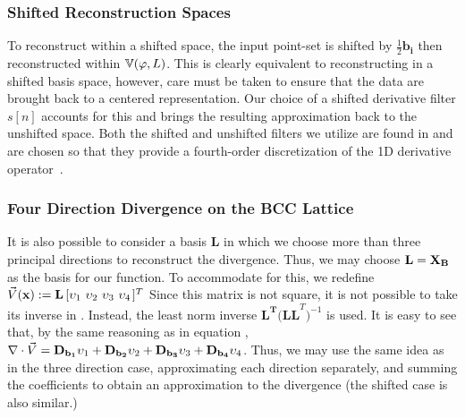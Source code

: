 \subsubsection{Shifted Reconstruction Spaces}
To reconstruct within a shifted space, the input point-set is shifted by $\frac{1}{2}\mathbf{b_i}$ then reconstructed within $\mathbb{V}(\varphi, L)$. This is clearly equivalent to reconstructing in a shifted basis space, however, care must be taken to ensure that the data are brought back to a centered representation. Our choice of a shifted derivative filter $s[n]$ accounts for this and brings the resulting approximation back to the unshifted space. Both the shifted and unshifted filters we utilize are found in  and are chosen so that they provide a fourth-order discretization of the 1D derivative operator~\cite{gradrev}. 

\subsubsection{Four Direction Divergence on the BCC Lattice}
It is also possible to consider a basis $\mathbf{L}$ in which we choose more than three principal directions to reconstruct the divergence. Thus, we may choose $\mathbf{L} = \mathbf{\mathbf{X}_{B}} $ as the basis for our function. To accommodate for this, we redefine $\vec{V}(\vx):=\mathbf{L} \left[\upsilon_1 \ \upsilon_2 \ \upsilon_3 \ \upsilon_4 \right.]^T$ Since this matrix is not square, it is not possible to take its inverse in . Instead, the least norm inverse $\mathbf{L^T(LL}^T\mathbf{)}^{-1}$ is used. It is easy to see that, by the same reasoning as in equation , $\nabla \cdot \vec{V} = \mathbf{D}_{\mathbf{b_1}}\upsilon_1 + \mathbf{D}_{\mathbf{b_2}}\upsilon_2 + \mathbf{D}_{\mathbf{b_3}}\upsilon_3 + \mathbf{D}_{\mathbf{b_4}}\upsilon_4$. Thus, we may use the same idea as in the three direction case, approximating each direction separately, and summing the coefficients to obtain an approximation to the divergence (the shifted case is also similar.)
